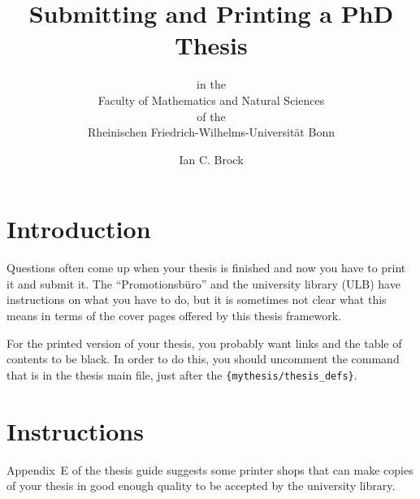 \documentclass[a4paper,twoside,ngerman,UKenglish]{scrartcl}
\begin{document}
\title{Submitting and Printing a PhD Thesis}
\subtitle{\vspace*{4ex}
    in the\\
    Faculty of Mathematics and Natural Sciences\\
    of the\\
    Rheinischen Friedrich-Wilhelms-Universität Bonn
}
\author{Ian C. Brock}
\maketitle

\section{Introduction}
Questions often come up when your thesis is finished and now you have
to print it and submit it. The \foreignquote{ngerman}{Promotionsbüro}
and the university library (ULB) have instructions on what you have to
do, but it is sometimes not clear what this means in terms of the
cover pages offered by this thesis framework.

For the printed version of your thesis, you probably want
 links and the table of contents to be black. In
order to do this, you should uncomment the  command
that is in the thesis main file, just after the
\texttt{\{mythesis/thesis\_defs\}}.

\section{Instructions}


Appendix~E of the thesis guide suggests some printer
shops that can make copies of your thesis in good enough quality to be
accepted by the university library.
\end{document}
